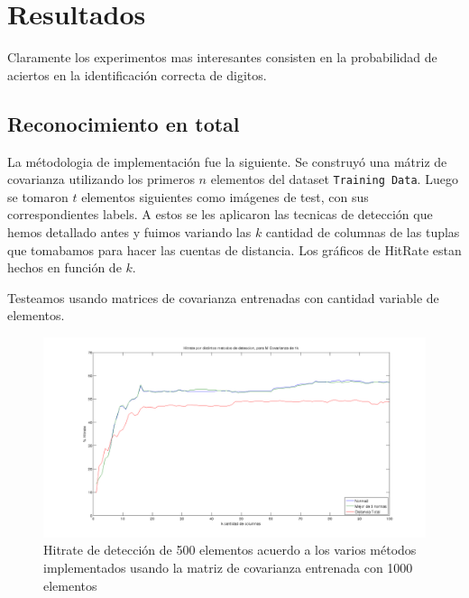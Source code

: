 \section{Resultados}

Claramente los experimentos mas interesantes consisten en la probabilidad
de aciertos en la identificaci\'on correcta de digitos.


\subsection{Reconocimiento en total}
La m\'etodologia de implementaci\'on fue la siguiente. Se construy\'o una m\'atriz de covarianza utilizando los
primeros $n$ elementos del dataset \texttt{Training Data}. Luego se tomaron $t$ elementos siguientes como
im\'agenes de test, con sus correspondientes labels. A estos se les aplicaron las tecnicas de detecci\'on
que hemos detallado antes y fuimos variando las $k$ cantidad de columnas de las tuplas que tomabamos para
hacer las cuentas de distancia. Los gr\'aficos de HitRate estan hechos en funci\'on de $k$.

Testeamos usando matrices de covarianza entrenadas con cantidad variable de elementos.

\begin{figure}[H]
\begin {center}
\includegraphics[width=400pt]{plots/hitrate-1kcv.png}
\end {center}
\caption{Hitrate de detecci\'on de 500 elementos acuerdo a los varios m\'etodos implementados
usando la matriz de covarianza entrenada con 1000 elementos}
\label{fig:HR1kcv}
\end{figure}

